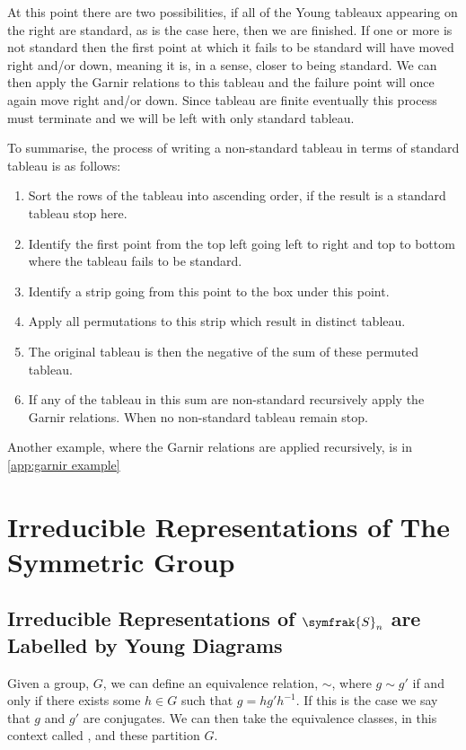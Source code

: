 \documentclass[fleqn]{NotesClass}
\newcommand{\symmetricGroup}[1][n]{\symfrak{S}_{#1}}
\begin{document}
    At this point there are two possibilities, if all of the Young tableaux appearing on the right are standard, as is the case here, then we are finished.
    If one or more is not standard then the first point at which it fails to be standard will have moved right and/or down, meaning it is, in a sense, closer to being standard.
    We can then apply the Garnir relations to this tableau and the failure point will once again move right and/or down.
    Since tableau are finite eventually this process must terminate and we will be left with only standard tableau.
    
    To summarise, the process of writing a non-standard tableau in terms of standard tableau is as follows:
    \begin{enumerate}
        \item Sort the rows of the tableau into ascending order, if the result is a standard tableau stop here.
        \item Identify the first point from the top left going left to right and top to bottom where the tableau fails to be standard.
        \item Identify a strip going from this point to the box under this point.
        \item Apply all permutations to this strip which result in distinct tableau.
        \item The original tableau is then the negative of the sum of these permuted tableau.
        \item If any of the tableau in this sum are non-standard recursively apply the Garnir relations.
        When no non-standard tableau remain stop.
    \end{enumerate}
    Another example, where the Garnir relations are applied recursively, is in \cref{app:garnir example}
    
    \chapter{Irreducible Representations of The Symmetric Group}
    \section{Irreducible Representations of \texorpdfstring{\(\symmetricGroup\)}{Sn} are Labelled by Young Diagrams}
    Given a group, \(G\), we can define an equivalence relation, \(\sim\), where \(g \sim g'\) if and only if there exists some \(h \in G\) such that \(g = hg'h^{-1}\).
    If this is the case we say that \(g\) and \(g'\) are conjugates.
    We can then take the equivalence classes, in this context called , and these partition \(G\).
    
\end{document}

